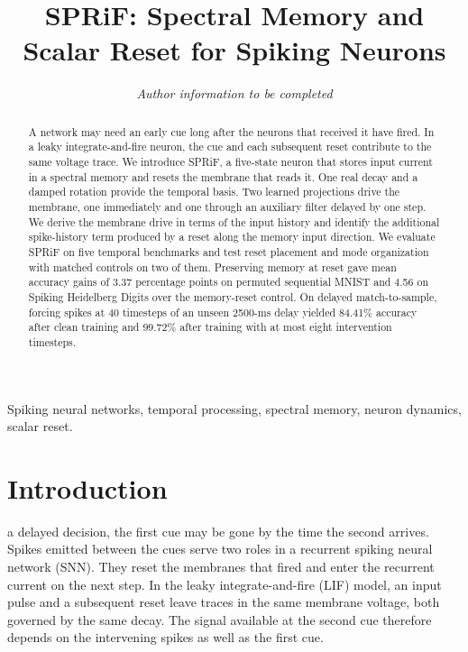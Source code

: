 \documentclass[letterpaper,journal]{IEEEtran}
\begin{document}
\title{SPRiF: Spectral Memory and Scalar Reset for Spiking Neurons}
\author{\textit{Author information to be completed}}
\maketitle

\begin{abstract}
A network may need an early cue long after the neurons that received it have fired. In a leaky integrate-and-fire neuron, the cue and each subsequent reset contribute to the same voltage trace. We introduce SPRiF, a five-state neuron that stores input current in a spectral memory and resets the membrane that reads it. One real decay and a damped rotation provide the temporal basis. Two learned projections drive the membrane, one immediately and one through an auxiliary filter delayed by one step. We derive the membrane drive in terms of the input history and identify the additional spike-history term produced by a reset along the memory input direction. We evaluate SPRiF on five temporal benchmarks and test reset placement and mode organization with matched controls on two of them. Preserving memory at reset gave mean accuracy gains of 3.37 percentage points on permuted sequential MNIST and 4.56 on Spiking Heidelberg Digits over the memory-reset control. On delayed match-to-sample, forcing spikes at 40 timesteps of an unseen 2500-ms delay yielded 84.41\% accuracy after clean training and 99.72\% after training with at most eight intervention timesteps.
\end{abstract}

\begin{IEEEkeywords}
Spiking neural networks, temporal processing, spectral memory, neuron dynamics, scalar reset.
\end{IEEEkeywords}

\section{Introduction}
\label{sec:introduction}

 a delayed decision, the first cue may be gone by the time the second arrives. Spikes emitted between the cues serve two roles in a recurrent spiking neural network (SNN). They reset the membranes that fired and enter the recurrent current on the next step. In the leaky integrate-and-fire (LIF) model, an input pulse and a subsequent reset leave traces in the same membrane voltage, both governed by the same decay. The signal available at the second cue therefore depends on the intervening spikes as well as the first cue.
\end{document}
